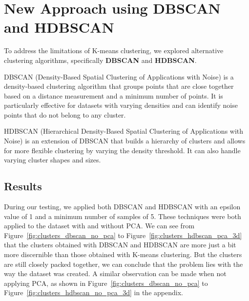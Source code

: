 \section{New Approach using DBSCAN and HDBSCAN}
\label{subsec:new_approach_dbscan_hdbscan}

To address the limitations of K-means clustering, we explored alternative clustering algorithms, specifically
\textbf{DBSCAN} and \textbf{HDBSCAN}.

DBSCAN (Density-Based Spatial Clustering of Applications with Noise) is a density-based clustering algorithm that
groups points that are close together based on a distance measurement and a minimum number of points. It is particularly
effective for datasets with varying densities and can identify noise points that do not belong to any cluster.

HDBSCAN (Hierarchical Density-Based Spatial Clustering of Applications with Noise) is an extension of DBSCAN that builds
a hierarchy of clusters and allows for more flexible clustering by varying the density threshold. It can also handle varying
cluster shapes and sizes.

\subsection{Results}
\label{subsec:results_dbscan_hdbscan}

During our testing, we applied both DBSCAN and HDBSCAN with an epsilon value of 1 and a minimum number of samples of 5.
These techniques were both applied to the dataset with and without PCA. We can see from Figure~\ref{fig:clusters_dbscan_no_pca}
to Figure~\ref{fig:clusters_hdbscan_pca_3d} that the clusters obtained with DBSCAN and HDBSCAN are more just a bit more
discernible than those obtained with K-means clustering. But the clusters are still closely packed together, we can conclude
that the problem lies with the way the dataset was created. A similar observation can be made when not applying PCA, as shown
in Figure~\ref{fig:clusters_dbscan_no_pca} to Figure~\ref{fig:clusters_hdbscan_no_pca_3d} in the appendix.

